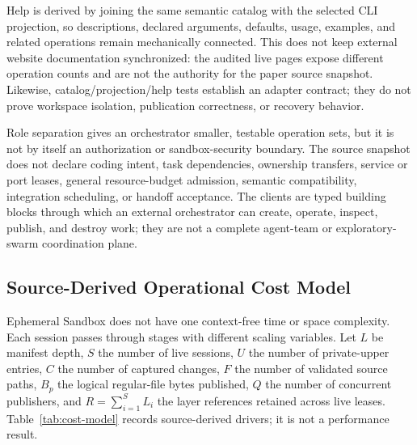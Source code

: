 Help is derived by joining the same semantic catalog with the selected CLI
projection, so descriptions, declared arguments, defaults, usage, examples,
and related operations remain mechanically connected.  This does not keep
external website documentation synchronized: the audited live pages expose
different operation counts and are not the authority for the paper source snapshot.
Likewise, catalog/projection/help tests establish an adapter contract; they do
not prove workspace isolation, publication correctness, or recovery behavior.

Role separation gives an orchestrator smaller, testable operation sets, but it
is not by itself an authorization or sandbox-security boundary.  The source snapshot
does not declare coding intent, task dependencies, ownership transfers,
service or port leases, general resource-budget admission, semantic
compatibility, integration scheduling, or handoff acceptance.  The clients
are typed building blocks through which an external orchestrator can create,
operate, inspect, publish, and destroy work; they are not a complete agent-team
or exploratory-swarm coordination plane.

\subsection{Source-Derived Operational Cost Model}
\label{sec:cost-model}

Ephemeral Sandbox does not have one context-free time or space complexity.
Each session passes through stages with different scaling variables.  Let
$L$ be manifest depth, $S$ the number of live sessions, $U$ the number of
private-upper entries, $C$ the number of captured changes, $F$ the number of
validated source paths, $B_p$ the logical regular-file bytes published, $Q$
the number of concurrent publishers, and $R=\sum_{i=1}^{S}L_i$ the layer
references retained across live leases.  Table~\ref{tab:cost-model} records
source-derived drivers; it is not a performance result.

